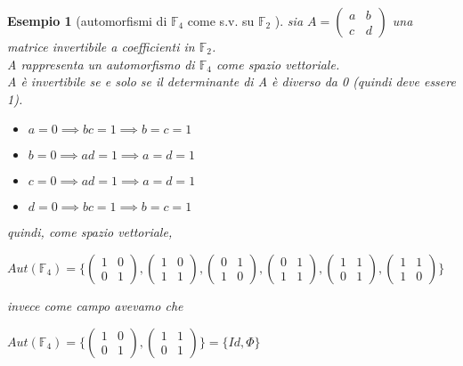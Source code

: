 \documentclass[a4paper,12pt]{article}
\theoremstyle{def}
\theoremstyle{prop}
\theoremstyle{esempio}
\newtheorem*{example}{Esempio}
\theoremstyle{dimostrazione}
\theoremstyle{teo}
\theoremstyle{osservazione}
\begin{document}
\begin{example}[automorfismi di \(\mathbb{F}_4\) come s.v. su \(\mathbb{F}_2\) ]
	sia \(A = \begin{pmatrix}
		a & b  \\
		c & d
	\end{pmatrix}\) una matrice invertibile a coefficienti in \(\mathbb{F}_2\).\\
	A rappresenta un automorfismo di \(\mathbb{F}_4\) come spazio vettoriale.\\
	A è invertibile se e solo se il determinante di A è diverso da 0 (quindi deve essere 1).\\
	\begin{itemize}
		\item \(a = 0 \implies bc = 1 \implies b = c = 1\)
		\item \(b = 0 \implies ad = 1 \implies a = d = 1\)
		\item \(c = 0 \implies ad = 1 \implies a = d = 1\)
		\item \(d = 0 \implies bc = 1 \implies b = c = 1\)
	\end{itemize}
	quindi, come spazio vettoriale, 
	\begin{center}
		\(Aut(\mathbb{F}_4) = \{ 
		\begin{pmatrix}
			1 & 0  \\
			0 & 1
		\end{pmatrix}, 
		\begin{pmatrix}
			1 & 0  \\
			1 & 1
		\end{pmatrix},
		\begin{pmatrix}
			0 & 1  \\
			1 & 0
		\end{pmatrix},
		\begin{pmatrix}
			0 & 1  \\
			1 & 1
		\end{pmatrix},
		\begin{pmatrix}
			1 & 1  \\
			0 & 1
		\end{pmatrix},
		\begin{pmatrix}
			1 & 1  \\
			1 & 0
		\end{pmatrix}
		\}\)
	\end{center}
	invece come campo avevamo che
	\begin{center}
		\(Aut(\mathbb{F}_4) = \{
		\begin{pmatrix}
			1 & 0  \\
			0 & 1
		\end{pmatrix},
		\begin{pmatrix}
			1 & 1  \\
			0 & 1
		\end{pmatrix}\} = \{Id, \Phi\}\)
	\end{center}
\end{example}
\end{document}
